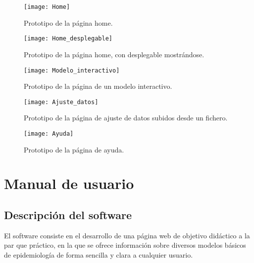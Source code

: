 \begin{figure}
\begin{center}
\caption{Prototipo de la página home.}
\label{wire: home}
\texttt{[image: Home]}
\end{center}
\end{figure}

\begin{figure}
\begin{center}
\caption{Prototipo de la página home, con desplegable mostrándose.}
\label{wire: home_desplegable}
\texttt{[image: Home\_desplegable]}
\end{center}
\end{figure}

\begin{figure}
\begin{center}
\caption{Prototipo de la página de un modelo interactivo.}
\label{wire: modelo_interactivo}
\texttt{[image: Modelo\_interactivo]}
\end{center}
\end{figure}

\begin{figure}
\begin{center}
\caption{Prototipo de la página de ajuste de datos subidos desde un fichero.}
\label{wire: ajuste}
\texttt{[image: Ajuste\_datos]}
\end{center}
\end{figure}

\begin{figure}
\begin{center}
\caption{Prototipo de la página de ayuda.}
\label{wire: ayuda}
\texttt{[image: Ayuda]}
\end{center}
\end{figure}

\section{Manual de usuario}

\subsection{Descripción del software}

El software consiste en el desarrollo de una página web de objetivo didáctico a la par que práctico, en la que se ofrece información sobre diversos modelos básicos de epidemiología de forma sencilla y clara a cualquier usuario.

